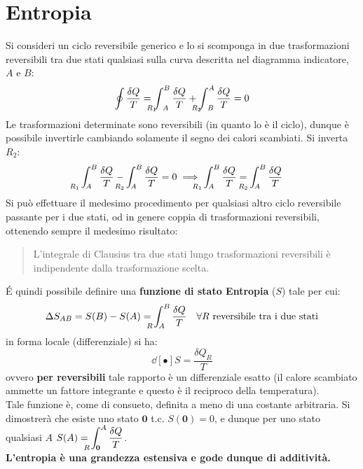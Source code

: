 \documentclass[10pt, oneside]{book}
\newcommand{\ds}{\displaystyle}
\begin{document}
\section{Entropia}
Si consideri un ciclo reversibile generico e lo si scomponga in due trasformazioni reversibili tra due stati qualsiasi sulla curva descritta nel diagramma indicatore, $A$ e $B$:
\[\oint \frac{\delta Q}{T} = \int_{\hspace{-0.45cm} R_1 \hspace{0.22cm} A}^B \frac{\delta Q}{T} + \int_{\hspace{-0.45cm} R_2 \hspace{0.22cm} B}^A \frac{\delta Q}{T} = 0\]
Le trasformazioni determinate sono reversibili (in quanto lo è il ciclo), dunque è possibile invertirle cambiando solamente il segno dei calori scambiati. Si inverta $R_2$:
\[\int_{\hspace{-0.6cm} R_1 \hspace{0.22cm} A}^B \frac{\delta Q}{T} - \int_{\hspace{-0.6cm} R_2 \hspace{0.22cm} A}^B \frac{\delta Q}{T} = 0 \implies \int_{\hspace{-0.6cm} R_1 \hspace{0.22cm} A}^B \frac{\delta Q}{T} = \int_{\hspace{-0.6cm} R_2 \hspace{0.22cm} A}^B \frac{\delta Q}{T}\]
Si può effettuare il medesimo procedimento per qualsiasi altro ciclo reversibile passante per i due stati, od in genere coppia di trasformazioni reversibili, ottenendo sempre il medesimo risultato:
\begin{quote}
L'integrale di Clausius tra due stati lungo trasformazioni reversibili è indipendente dalla trasformazione scelta.
\end{quote}

\'E quindi possibile definire una \textbf{funzione di stato Entropia} ($S$) tale per cui:
\[ \Delta S_{AB} = S(B) - S(A) = \int_{\hspace{-0.45cm} R \hspace{0.22cm} A}^B	 \frac{\delta Q}{T} \quad \forall R \textrm{ reversibile tra i due stati}\]
in forma locale (differenziale) si ha:
\[\dd[•]{S} = \frac{\delta Q_R}{T}\]
ovvero \textbf{per reversibili} tale rapporto è un differenziale esatto (il calore scambiato ammette un fattore integrante e questo è il reciproco della temperatura).\\
Tale funzione è, come di consueto, definita a meno di una costante arbitraria. Si dimostrerà che esiste uno stato $\mathbf{0}$ t.c. $S(\mathbf{0}) = 0$, e dunque per uno stato qualsiasi $A$ $\ds S(A) = \int_{\hspace{-0.45cm} R \hspace{0.22cm} \mathbf{0}}^A \frac{\delta Q}{T}$.\\
\textbf{L'entropia è una grandezza estensiva e gode dunque di additività.}
\end{document}
